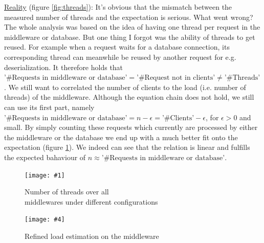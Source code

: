 \documentclass[11pt]{article}
\newcommand\TwoFig[6]{%
	\sbox\IBoxA{\texttt{[image: \#1]}}
	\sbox\IBoxB{\texttt{[image: \#4]}}%
	\ifdim\ht\IBoxA>\ht\IBoxB
	\setlength\IHeight{\ht\IBoxB}\else\setlength\IHeight{\ht\IBoxA}\fi%
	\begin{figure}[!htb]
		\minipage[t]{0.5\textwidth}\centering
		\texttt{[image: \#1]}
		\caption{#2}\label{#3}
		\endminipage \hfill
		\minipage[t]{0.5\textwidth}\centering
		\texttt{[image: \#4]}
		\caption{#5}\label{#6}
		\endminipage
	\end{figure}%
}
\begin{document}
\newline\underline{Reality} (figure \ref{fig:threads}): It's obvious that the mismatch between the measured number of threads and the expectation is serious. What went wrong? The whole analysis was based on the idea of having one thread per request in the middleware or database. But one thing I forgot was the ability of threads to get reused. For example when a request waits for a database connection, its corresponding thread can meanwhile be reused by another request for e.g. deserialization. It therefore holds that  $\text{'\#Requests in middleware or database'}=\text{'\#Request not in clients'}\neq\text{'\#Threads'}$. We still want to correlated the number of clients to the load (i.e. number of threads) of the middleware. Although the equation chain does not hold, we still can use its first part, namely $\text{'\#Requests in middleware or database'}=n-\epsilon=\text{'\#Clients'}-\epsilon$, for $\epsilon>0$ and small. By simply counting these requests which currently are processed by either the middleware or the database we end up with a much better fit onto the expectation (figure \ref{fig:refined_mw_load}). We indeed can see that the relation is linear and fulfills the expected bahaviour of $n\approx\text{'\#Requests in middleware or database'}$.

\TwoFig {figures/middleware/threads} {Number of threads over all\\middlewares under different configurations}
		{fig:threads}
		{figures/middleware/req_vs_clients_on_mw} {Refined load estimation on the middleware} {fig:refined_mw_load}
\end{document}
